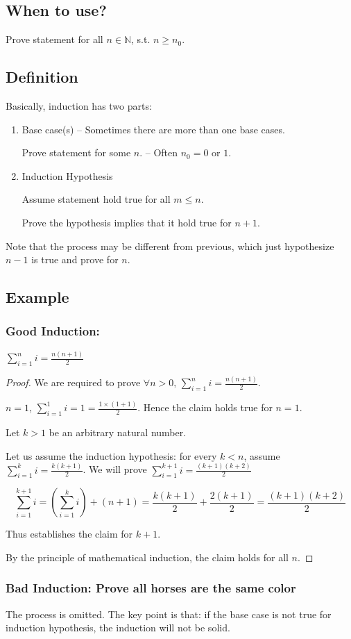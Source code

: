 \subsection{When to use?}

Prove statement for all $n \in \mathbb{N}$, s.t. $n \geq n_0$.

\subsection{Definition}
Basically, induction has two parts:
\begin{enumerate}
\item {Base case(s) -- Sometimes there are more than one base cases.

Prove statement for some $n$. -- Often $n_0 = 0 \text{ or } 1$.}

\item {Induction Hypothesis

Assume statement hold true for all $m \leq n$.

Prove the hypothesis implies that it hold true for $n+1$.}
\end{enumerate}

Note that the process may be different from previous, which just hypothesize $n-1$ is true and prove for $n$.

\subsection{Example}
\subsubsection{Good Induction:}

\Claim  $\sum _{i=1}^n i = \frac{n(n+1)}{2}$

\begin{proof}
We are required to prove $\forall n > 0 \text{, } \sum _{i=1}^n i = \frac{n(n+1)}{2}$.


\BaseCase $n=1$, $\sum _{i=1}^1 i = 1 = \frac{1\times (1+1)}{2}$. Hence the claim holds true for $n=1$.

\InductionStep Let $k > 1$ be an arbitrary natural number.

Let us assume the induction hypothesis: for every $k < n$, assume $\sum _{i=1}^k i = \frac{k(k+1)}{2}$. We will prove $\sum _{i=1}^{k+1} i = \frac{(k+1)(k+2)}{2}$

\begin{equation}
\sum _{i=1}^{k+1} i = \left(\sum _{i=1}^{k} i \right) + (n+1)
                    = \frac{k(k+1)}{2} + \frac{2(k+1)}{2}
                    = \frac{(k+1)(k+2)}{2}
\end{equation}

Thus establishes the claim for $k+1$.

\InductionConclusion By the principle of mathematical induction, the claim holds for all $n$.
\end{proof}

\subsubsection{Bad Induction: Prove all horses are the same color}

The process is omitted. The key point is that: if the base case is not true for induction hypothesis, the induction will not be solid.





